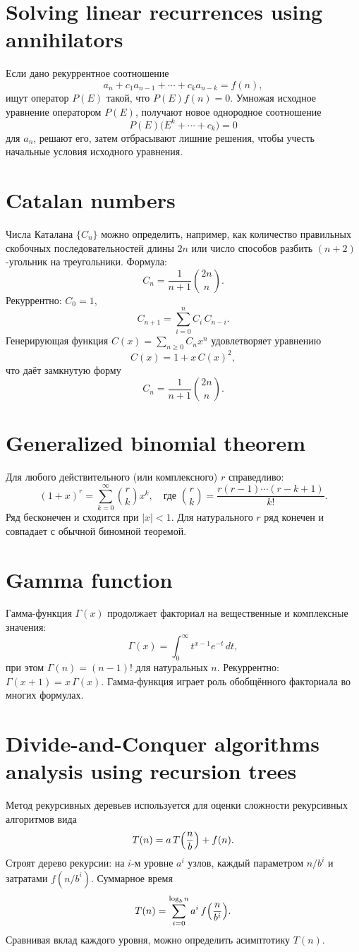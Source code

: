 \documentclass{article}
\begin{document}
\section{Solving linear recurrences using annihilators}
Если дано рекуррентное соотношение 
\[
a_n + c_1 a_{n-1} + \cdots + c_k a_{n-k} = f(n),
\]
ищут оператор $P(E)$ такой, что $P(E)f(n)=0$. Умножая исходное уравнение оператором $P(E)$, получают новое однородное соотношение 
\[
P(E)\bigl(E^k + \cdots + c_k\bigr)=0
\]
для $a_n$, решают его, затем отбрасывают лишние решения, чтобы учесть начальные условия исходного уравнения.

\section{Catalan numbers}
Числа Каталана $\{C_n\}$ можно определить, например, как количество правильных скобочных последовательностей длины $2n$ или число способов разбить $(n+2)$-угольник на треугольники. Формула:
\[
C_n = \frac{1}{n+1}\binom{2n}{n}.
\]
Рекуррентно: $C_0=1$, 
\[
C_{n+1} = \sum_{i=0}^n C_i\,C_{n-i}.
\]
Генерирующая функция $C(x)=\sum_{n\ge0}C_n x^n$ удовлетворяет уравнению 
\[
C(x)=1 + x\,C(x)^2,
\]
что даёт замкнутую форму 
\[
C_n = \frac{1}{n+1}\binom{2n}{n}.
\]

\section{Generalized binomial theorem}
Для любого действительного (или комплексного) $r$ справедливо:
\[
(1+x)^r = \sum_{k=0}^\infty \binom{r}{k} x^k, \quad \text{где } \binom{r}{k} = \frac{r(r-1)\cdots(r-k+1)}{k!}.
\]
Ряд бесконечен и сходится при $|x|<1$. Для натурального $r$ ряд конечен и совпадает с обычной биномной теоремой.

\section{Gamma function}
Гамма-функция $\Gamma(x)$ продолжает факториал на вещественные и комплексные значения:
\[
\Gamma(x) = \int_0^\infty t^{x-1} e^{-t}\,dt,
\]
при этом $\Gamma(n)=(n-1)!$ для натуральных $n$. Рекуррентно: $\Gamma(x+1)=x\,\Gamma(x)$. Гамма-функция играет роль обобщённого факториала во многих формулах.

\section{Divide-and-Conquer algorithms analysis using recursion trees}
Метод рекурсивных деревьев используется для оценки сложности рекурсивных алгоритмов вида 
\[
T(n)=a\,T\Bigl(\frac{n}{b}\Bigr) + f(n).
\]
Строят дерево рекурсии: на $i$-м уровне $a^i$ узлов, каждый параметром $n/b^i$ и затратами $f(n/b^i)$. Суммарное время 
\[
T(n)=\sum_{i=0}^{\log_b n} a^i\,f\Bigl(\frac{n}{b^i}\Bigr).
\]
Сравнивая вклад каждого уровня, можно определить асимптотику $T(n)$.
\end{document}

